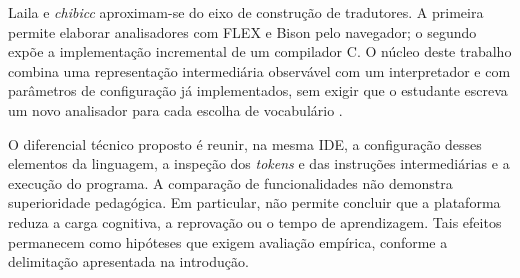 Laila e \textit{chibicc} aproximam-se do eixo de construção de tradutores. A primeira permite elaborar analisadores com FLEX e Bison pelo navegador; o segundo expõe a implementação incremental de um compilador C. O núcleo deste trabalho combina uma representação intermediária observável com um interpretador e com parâmetros de configuração já implementados, sem exigir que o estudante escreva um novo analisador para cada escolha de vocabulário \cite{ladgelson2021,ueyama2020}.

O diferencial técnico proposto é reunir, na mesma IDE, a configuração desses elementos da linguagem, a inspeção dos \textit{tokens} e das instruções intermediárias e a execução do programa. A comparação de funcionalidades não demonstra superioridade pedagógica. Em particular, não permite concluir que a plataforma reduza a carga cognitiva, a reprovação ou o tempo de aprendizagem. Tais efeitos permanecem como hipóteses que exigem avaliação empírica, conforme a delimitação apresentada na introdução.
